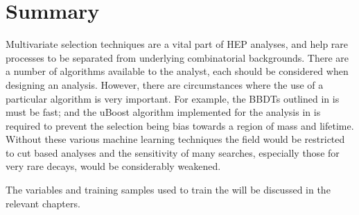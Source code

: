 \section{Summary}
Multivariate selection techniques are a vital part of \gls{HEP} analyses, and help rare
processes to be separated from underlying combinatorial backgrounds.
There are a number of algorithms available to the analyst, each should be considered when designing
an analysis.
However, there are circumstances where the use of a particular algorithm is very important.
For example, the \glspl{BBDT} outlined in  is must be fast; and the uBoost
algorithm implemented for the analysis in  is required to prevent the selection being
bias towards a region of mass and lifetime.
Without these various machine learning techniques the field would be restricted to cut based
analyses and the sensitivity of many searches, especially those for very rare decays, would be
considerably weakened.

The variables and training samples used to train the \BDTs will be discussed in the relevant
chapters.
